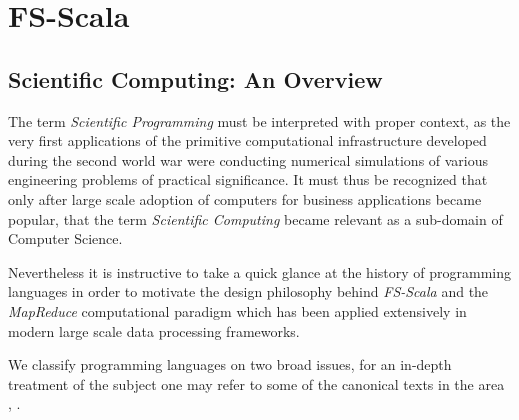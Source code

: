 \chapter{FS-Scala}
\label{cha:2}

\section{Scientific Computing: An Overview}
The term \textit{Scientific Programming} must be interpreted with proper context, as the very first applications of the primitive computational infrastructure developed during the second world war were conducting numerical simulations of various engineering problems of practical significance. It must thus be recognized that only after large scale adoption of computers for business applications became popular, that the term \textit{Scientific Computing} became relevant as a sub-domain of Computer Science.

Nevertheless it is instructive to take a quick glance at the history of programming languages in order to motivate the design philosophy behind \textit{FS-Scala} and the \textit{MapReduce} computational paradigm which has been applied extensively in modern large scale data processing frameworks.

We classify programming languages on two broad issues, for an in-depth treatment of the subject one may refer to some of the canonical texts in the area \cite{Sethi:1989}, \cite{Abelson:1996:SIC:547755}.

